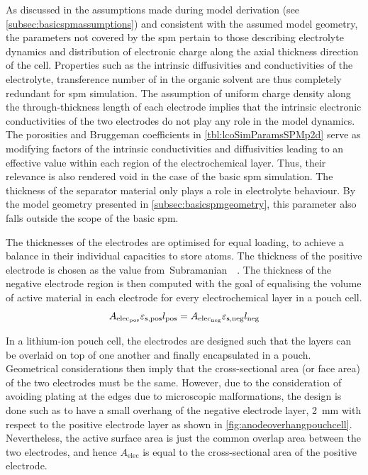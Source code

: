 As    discussed   in    the   assumptions    made   during    model   derivation
(see \cref{subsec:basicspmassumptions})  and consistent  with the  assumed model
geometry,  the  parameters  not  covered  by  the  \gls{spm}  pertain  to  those
describing electrolyte dynamics and distribution  of electronic charge along the
axial  thickness  direction  of  the  cell. Properties  such  as  the  intrinsic
diffusivities  and conductivities  of  the electrolyte,  transference number  of
 in  the organic  solvent are thus  completely redundant  for \gls{spm}
simulation. The assumption of uniform charge density along the through-thickness
length of each electrode implies that the intrinsic electronic conductivities of
the two electrodes  do not play any  role in the model  dynamics. The porosities
and Bruggeman  coefficients in \cref{tbl:lcoSimParamsSPMp2d} serve  as modifying
factors  of  the  intrinsic  conductivities  and  diffusivities  leading  to  an
effective value  within each  region of the  electrochemical layer.  Thus, their
relevance is also  rendered void in the case of  the basic \gls{spm} simulation.
The  thickness of  the  separator  material only  plays  a  role in  electrolyte
behaviour.  By the  model geometry  presented in \cref{subsec:basicspmgeometry},
this parameter also falls outside the scope of the basic \gls{spm}.

The  thicknesses  of the  electrodes  are  optimised  for equal  loading,  \ie{}
to  achieve  a   balance  in  their  individual  capacities   to  store  
atoms.  The  thickness  of  the  positive  electrode  is  chosen  as  the  value
from~Subramanian~\etal{}~\cite{Subramanian2009}. The  thickness of  the negative
electrode region  is then  computed with  the goal of  equalising the  volume of
active material  in each electrode  for every  electrochemical layer in  a pouch
cell.
\begin{equation}\label{eq:basiccapacitybalance}
    A_{\text{elec}_\text{pos}}\varepsilon_{\text{s,pos}} l_\text{pos} = A_{\text{elec}_\text{neg}}\varepsilon_{\text{s,neg}} l_\text{neg}
\end{equation}

In a  lithium-ion pouch cell, the  electrodes are designed such  that the layers
can be  overlaid on  top of  one another  and finally  encapsulated in  a pouch.
Geometrical considerations  then imply  that the  cross-sectional area  (or face
area) of the two electrodes must be  the same. However, due to the consideration
of  avoiding  plating  at  the  edges  due  to  microscopic  malformations,  the
design  is done  such as  to have  a small  overhang of  the negative  electrode
layer,  \approx\SI{2}{\milli\meter}  with  respect  to  the  positive  electrode
layer  as  shown  in \cref{fig:anodeoverhangpouchcell}.
Nevertheless, the  active surface area is  just the common overlap  area between
the two  electrodes, and hence  $A_\text{elec}$ is equal to  the cross-sectional
area of the positive electrode.


